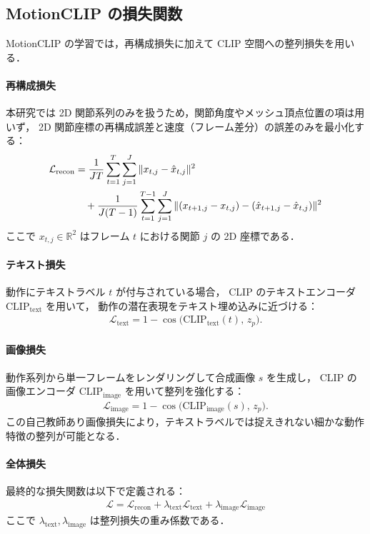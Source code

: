\subsection{MotionCLIP の損失関数}
\label{subsec:motionclip_loss}

MotionCLIP の学習では，再構成損失に加えて CLIP 空間への整列損失を用いる．

\paragraph{再構成損失}
本研究では 2D 関節系列のみを扱うため，関節角度やメッシュ頂点位置の項は用いず，
2D 関節座標の再構成誤差と速度（フレーム差分）の誤差のみを最小化する：
\begin{align}
  \mathcal{L}_{\mathrm{recon}}
   & = \frac{1}{JT}\sum_{t=1}^{T}\sum_{j=1}^{J}\|x_{t,j} - \hat{x}_{t,j}\|^2 \notag \\
   & \quad + \frac{1}{J(T-1)}\sum_{t=1}^{T-1}\sum_{j=1}^{J}
  \|(x_{t+1,j}-x_{t,j})-(\hat{x}_{t+1,j}-\hat{x}_{t,j})\|^2
  \label{eq:motionclip_recon}
\end{align}
ここで $x_{t,j}\in\mathbb{R}^2$ はフレーム $t$ における関節 $j$ の 2D 座標である．

\paragraph{テキスト損失}
動作にテキストラベル $t$ が付与されている場合，
CLIP のテキストエンコーダ $\mathrm{CLIP}_{\mathrm{text}}$ を用いて，
動作の潜在表現をテキスト埋め込みに近づける：
\begin{align}
  \mathcal{L}_{\mathrm{text}} = 1 - \cos\bigl(\mathrm{CLIP}_{\mathrm{text}}(t),\, z_p\bigr).
  \label{eq:motionclip_text}
\end{align}

\paragraph{画像損失}
動作系列から単一フレームをレンダリングして合成画像 $s$ を生成し，
CLIP の画像エンコーダ $\mathrm{CLIP}_{\mathrm{image}}$ を用いて整列を強化する：
\begin{align}
  \mathcal{L}_{\mathrm{image}} = 1 - \cos\bigl(\mathrm{CLIP}_{\mathrm{image}}(s),\, z_p\bigr).
  \label{eq:motionclip_image}
\end{align}
この自己教師あり画像損失により，テキストラベルでは捉えきれない細かな動作特徴の整列が可能となる．

\paragraph{全体損失}
最終的な損失関数は以下で定義される：
\begin{align}
  \mathcal{L} = \mathcal{L}_{\mathrm{recon}} + \lambda_{\mathrm{text}}\mathcal{L}_{\mathrm{text}} + \lambda_{\mathrm{image}}\mathcal{L}_{\mathrm{image}}
  \label{eq:motionclip_total}
\end{align}
ここで $\lambda_{\mathrm{text}}, \lambda_{\mathrm{image}}$ は整列損失の重み係数である．

